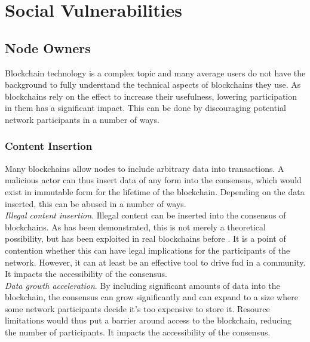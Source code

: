 \documentclass[12pt,a4paper]{article}
\begin{document}
\section{Social Vulnerabilities}

\subsection{Node Owners}

Blockchain technology is a complex topic and many average users do not have the background to fully understand the technical aspects of \glspl{blockchain} they use. As \glspl{blockchain} rely on the \gls{effect} to increase their usefulness, lowering participation in them has a significant impact. This can be done by discouraging potential network participants in a number of ways.\\

\subsubsection{Content Insertion}

Many \glspl{blockchain} allow \glspl{node} to include arbitrary data into \glspl{transaction}. A malicious actor can thus insert data of any form into the \gls{consensus}, which would exist in immutable form for the lifetime of the \gls{blockchain}. Depending on the data inserted, this can be abused in a number of ways.\\

\textit{Illegal content insertion}. Illegal content can be inserted into the \gls{consensus} of \glspl{blockchain}. As has been demonstrated, this is not merely a theoretical possibility, but has been exploited in real \glspl{blockchain} before \cite{content}. It is a point of contention whether this can have legal implications for the participants of the network. However, it can at least be an effective tool to drive \acrfull{fud} in a community. It impacts the accessibility of the \gls{consensus}.\\

\textit{Data growth acceleration}. By including significant amounts of data into the blockchain, the \gls{consensus} can grow significantly and can expand to a size where some network participants decide it's too expensive to store it. Resource limitations would thus put a barrier around access to the \gls{blockchain}, reducing the number of participants. It impacts the accessibility of the \gls{consensus}.\\
\end{document}
